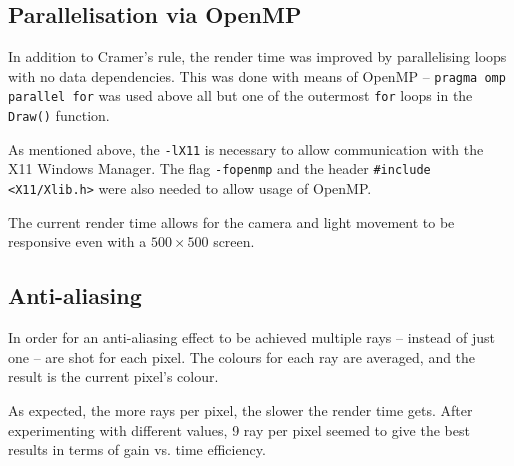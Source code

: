 \documentclass[DIV=calc, paper=a4, fontsize=11pt, twocolumn]{article}	 %
\begin{document}
	\subsection*{Parallelisation via OpenMP}
	In addition to Cramer's rule, the render time was improved by parallelising loops with no data dependencies. This was done with means of OpenMP -- \texttt{pragma omp parallel for} was used above all but one of the outermost \texttt{for} loops in the \texttt{Draw()} function.
	\par
	As mentioned above, the \texttt{-lX11} is necessary to allow communication with the X11 Windows Manager. The flag \texttt{-fopenmp} and the header \texttt{\#include <X11/Xlib.h>} were also needed to allow usage of OpenMP.
	\par
	The current render time allows for the camera and light movement to be responsive even with a $500\times500$ screen.
	
	\subsection*{Anti-aliasing}
	In order for an anti-aliasing effect to be achieved multiple rays -- instead of just one -- are shot for each pixel. The colours for each ray are averaged, and the result is the current pixel's colour.
	\par
	As expected, the more rays per pixel, the slower the render time gets. After experimenting with different values, 9 ray per pixel seemed to give the best results in terms of gain vs. time efficiency.
\end{document}

